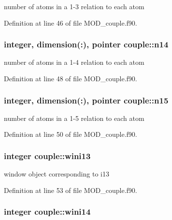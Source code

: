 number of atoms in a 1-\/3 relation to each atom 



Definition at line 46 of file M\-O\-D\-\_\-couple.\-f90.

\hypertarget{classcouple_af2d96c50be5d9f3e7acb2f9dbd162f9b}{
\subsubsection[{n14}]{\setlength{\rightskip}{0pt plus 5cm}integer, dimension(\-:), pointer couple\-::n14}}\label{classcouple_af2d96c50be5d9f3e7acb2f9dbd162f9b}


number of atoms in a 1-\/4 relation to each atom 



Definition at line 48 of file M\-O\-D\-\_\-couple.\-f90.

\hypertarget{classcouple_a5ea066288de09e972ebe72bc0b5a5bb6}{
\subsubsection[{n15}]{\setlength{\rightskip}{0pt plus 5cm}integer, dimension(\-:), pointer couple\-::n15}}\label{classcouple_a5ea066288de09e972ebe72bc0b5a5bb6}


number of atoms in a 1-\/5 relation to each atom 



Definition at line 50 of file M\-O\-D\-\_\-couple.\-f90.

\hypertarget{classcouple_af7960f868acfdd2695e93554d2c7d13c}{
\subsubsection[{wini13}]{\setlength{\rightskip}{0pt plus 5cm}integer couple\-::wini13}}\label{classcouple_af7960f868acfdd2695e93554d2c7d13c}


window object corresponding to i13 



Definition at line 53 of file M\-O\-D\-\_\-couple.\-f90.

\hypertarget{classcouple_a91dc2bff58d622bfa7ed6c3ed75914e0}{
\subsubsection[{wini14}]{\setlength{\rightskip}{0pt plus 5cm}integer couple\-::wini14}}\label{classcouple_a91dc2bff58d622bfa7ed6c3ed75914e0}


